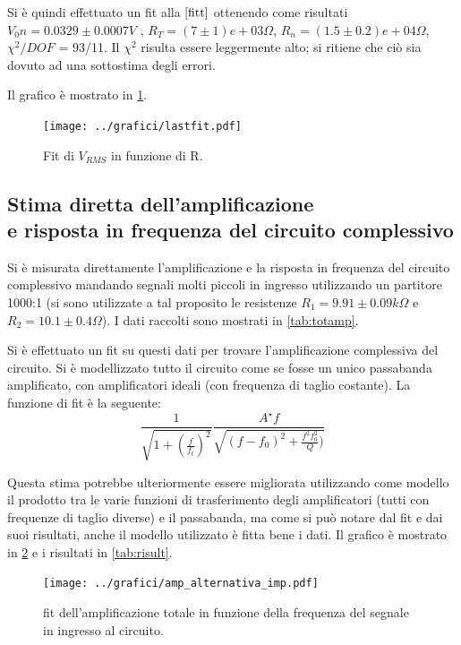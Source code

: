 \documentclass[a4paper,10pt]{article}
\begin{document}
Si è quindi effettuato un fit alla $\eqref{fitt}$ ottenendo come risultati $V_0n = 0.0329\pm0.0007 V$ , $R_T = (7\pm1)e+03 \Omega $, $R_n = (1.5\pm 0.2)e+04 \Omega$, $\chi ^2 /DOF$ = 93/11. Il $\chi ^2$ risulta essere leggermente alto; si ritiene che ciò sia dovuto ad una sottostima degli errori.

Il grafico è mostrato in \cref{fig:lastfit}.


\begin{figure}[H]
	\centering
	\texttt{[image: ../grafici/lastfit.pdf]}
	\caption{Fit di $V_{RMS}$ in funzione di R.}
	\label{fig:lastfit}
\end{figure}



\subsection{Stima diretta dell'amplificazione \\e risposta in frequenza del circuito complessivo}
Si è misurata direttamente l'amplificazione e la risposta in frequenza del circuito complessivo mandando segnali molti piccoli in ingresso utilizzando un partitore 1000:1 (si sono utilizzate a tal proposito le resistenze $R_1 = 9.91\pm0.09 k\Omega $ e $R_2 = 10.1\pm0.4 \Omega$).
I dati raccolti sono mostrati in \cref{tab:totamp}.

Si è effettuato un fit su questi dati per trovare l'amplificazione complessiva del circuito. Si è modellizzato tutto il circuito come se fosse un unico passabanda amplificato, con amplificatori ideali (con frequenza di taglio costante). La funzione di fit è la seguente:
\begin{equation}
\frac{1}{\sqrt{1+(\frac{f}{f_t})^2}} \frac{A^\star f}{\sqrt{(f - f_0)^2+ \frac{f^2 f_0^2}{Q} )}}
\end{equation}

Questa stima potrebbe ulteriormente essere migliorata utilizzando come modello il prodotto tra le varie funzioni di trasferimento degli amplificatori (tutti con frequenze di taglio diverse) e il passabanda, ma come si può notare dal fit e dai suoi risultati, anche il modello utilizzato è fitta bene i dati. Il grafico è mostrato in \cref{fig:ampltot} e i risultati in \cref{tab:risult}.

\begin{figure}[H]
	\centering
	\texttt{[image: ../grafici/amp\_alternativa\_imp.pdf]}
	\caption{fit dell'amplificazione totale in funzione della frequenza del segnale in ingresso al circuito.}
	\label{fig:ampltot}
\end{figure}
\end{document}
